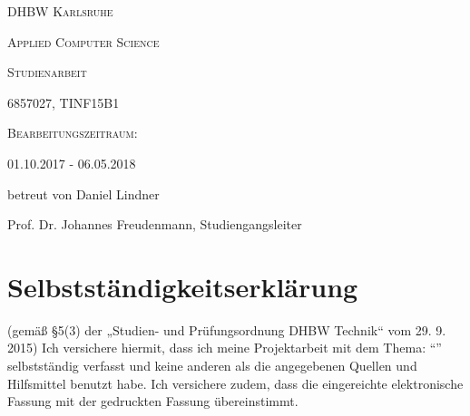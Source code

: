 \makeatletter
\begin{titlepage}
\centering
	{\scshape\LARGE DHBW Karlsruhe \par}
	{\scshape Applied Computer Science \par}
	\vspace{1cm}
	{\scshape\Large Studienarbeit\par}
	\vspace{1.5cm}
	{\huge\textbf{\@title} \par}
	\vspace{2cm}
	{\Large \@author \par}
	{\Large 6857027, TINF15B1 \par}
	\vspace{6cm}
	
	{\scshape
	Bearbeitungszeitraum:\par
	01.10.2017 - 06.05.2018\par
	betreut von Daniel Lindner \par 
	Prof. Dr. Johannes Freudenmann, Studiengangsleiter}

\end{titlepage}

\section*{Selbstständigkeitserklärung}
(gemäß §5(3) der „Studien- und Prüfungsordnung DHBW Technik“ vom 29. 9. 2015)
Ich versichere hiermit, dass ich meine Projektarbeit mit dem Thema: "`\@title"' selbstständig verfasst und keine anderen als die angegebenen Quellen und Hilfsmittel benutzt habe. Ich versichere zudem, dass die eingereichte elektronische Fassung mit der gedruckten Fassung übereinstimmt.

\vspace{2 cm}
